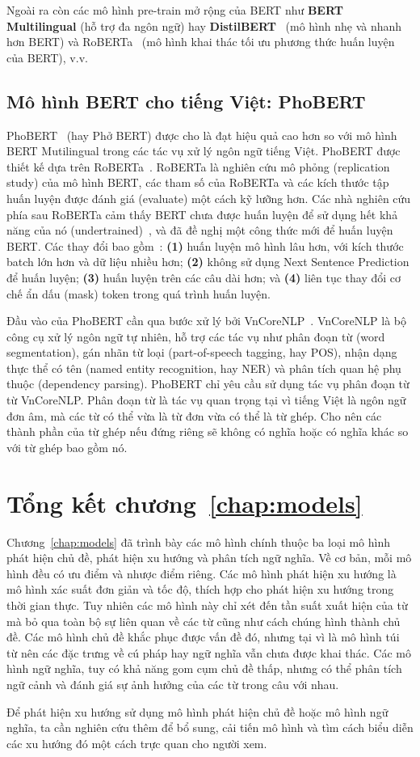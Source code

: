 Ngoài ra còn các mô hình pre-train mở rộng của BERT như \textbf{BERT Multilingual} (hỗ trợ đa ngôn ngữ) hay \textbf{DistilBERT}~\cite{sanhDistilBERTDistilledVersion2020} (mô hình nhẹ và nhanh hơn BERT) và RoBERTa~\cite{liuRoBERTaRobustlyOptimized2019} (mô hình khai thác tối ưu phương thức huấn luyện của BERT), v.v.

\subsection{Mô hình BERT cho tiếng Việt: PhoBERT}
PhoBERT~\cite{nguyenPhoBERTPretrainedLanguage2020} (hay Phở BERT) được cho là đạt hiệu quả cao hơn so với mô hình BERT Mutilingual trong các tác vụ xử lý ngôn ngữ tiếng Việt. PhoBERT được thiết kế dựa trên RoBERTa~\cite{liuRoBERTaRobustlyOptimized2019}. RoBERTa là nghiên cứu mô phỏng (replication study) của mô hình BERT, các tham số của RoBERTa và các kích thước tập huấn luyện được đánh giá (evaluate) một cách kỹ lưỡng hơn. Các nhà nghiên cứu phía sau RoBERTa cảm thấy BERT chưa được huấn luyện để sử dụng hết khả năng của nó (undertrained)~\cite{liuRoBERTaRobustlyOptimized2019}, và đã đề nghị một công thức mới để huấn luyện BERT. Các thay đổi bao gồm~\cite{liuRoBERTaRobustlyOptimized2019}: \textbf{(1)} huấn luyện mô hình lâu hơn, với kích thước batch lớn hơn và dữ liệu nhiều hơn; \textbf{(2)} không sử dụng Next Sentence Prediction để huấn luyện; \textbf{(3)} huấn luyện trên các câu dài hơn; và \textbf{(4)} liên tục thay đổi cơ chế ẩn dấu (mask) token trong quá trình huấn luyện.

Đầu vào của PhoBERT cần qua bước xử lý bởi VnCoreNLP~\cite{vuVnCoreNLPVietnameseNatural2018}. VnCoreNLP là bộ công cụ xử lý ngôn ngữ tự nhiên, hỗ trợ các tác vụ như phân đoạn từ (word segmentation), gán nhãn từ loại (part-of-speech tagging, hay POS), nhận dạng thực thể có tên (named entity recognition, hay NER) và phân tích quan hệ phụ thuộc (dependency parsing). PhoBERT chỉ yêu cầu sử dụng tác vụ phân đoạn từ từ VnCoreNLP. Phân đoạn từ là tác vụ quan trọng tại vì tiếng Việt là ngôn ngữ đơn âm, mà các từ có thể vừa là từ đơn vừa có thể là từ ghép. Cho nên các thành phần của từ ghép nếu đứng riêng sẽ không có nghĩa hoặc có nghĩa khác so với từ ghép bao gồm nó.

\section{Tổng kết chương~\ref{chap:models}}
Chương~\ref{chap:models} đã trình bày các mô hình chính thuộc ba loại mô hình phát hiện chủ đề, phát hiện xu hướng và phân tích ngữ nghĩa. Về cơ bản, mỗi mô hình đều có ưu điểm và nhược điểm riêng. Các mô hình phát hiện xu hướng là mô hình xác suất đơn giản và tốc độ, thích hợp cho phát hiện xu hướng trong thời gian thực. Tuy nhiên các mô hình này chỉ xét đến tần suất xuất hiện của từ mà bỏ qua toàn bộ sự liên quan về các từ cũng như cách chúng hình thành chủ đề.  Các mô hình chủ đề khắc phục được vấn đề đó, nhưng tại vì là mô hình túi từ nên các đặc trưng về cú pháp hay ngữ nghĩa vẫn chưa được khai thác. Các mô hình ngữ nghĩa, tuy có khả năng gom cụm chủ đề thấp, nhưng có thể phân tích ngữ cảnh và đánh giá sự ảnh hưởng của các từ trong câu với nhau.

Để phát hiện xu hướng sử dụng mô hình phát hiện chủ đề hoặc mô hình ngữ nghĩa, ta cần nghiên cứu thêm để bổ sung, cải tiến mô hình và tìm cách biểu diễn các xu hướng đó một cách trực quan cho người xem.